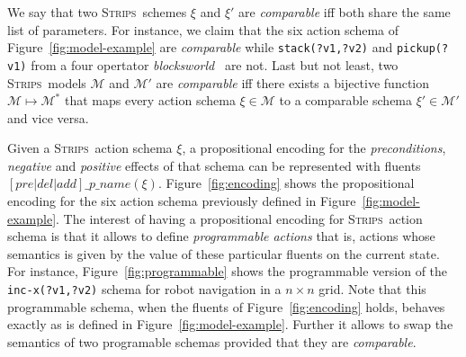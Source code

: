 \documentclass[letterpaper]{article} %
\newcommand{\strips}{\textsc{Strips}}     %
\begin{document}
We say that two \strips\ schemes $\xi$ and $\xi'$ are {\em comparable} iff both share the same list of parameters. For instance, we claim that the six action schema of Figure~\ref{fig:model-example} are {\em comparable} while {\small\tt stack(?v1,?v2)} and {\small\tt pickup(?v1)} from a four opertator {\em blocksworld}~\cite{slaney2001blocks} are not. Last but not least, two \strips\ models $\mathcal{M}$ and $\mathcal{M}'$ are {\em comparable} iff there exists a bijective function $\mathcal{M} \mapsto \mathcal{M}^*$ that maps every action schema $\xi\in\mathcal{M}$ to a comparable schema $\xi'\in\mathcal{M'}$ and vice versa.

Given a \strips\ action schema $\xi$, a propositional encoding for the {\em preconditions}, {\em negative} and {\em positive} effects of that schema can be represented with fluents $[pre|del|add]\_p\_name(\xi)$. Figure~\ref{fig:encoding} shows the propositional encoding for the six action schema previously defined in Figure~\ref{fig:model-example}. The interest of having a propositional encoding for \strips\ action schema is that it allows to define {\em programmable actions} that is, actions whose semantics is given by the value of these particular fluents on the current state. For instance, Figure~\ref{fig:programmable} shows the programmable version of the {\tt\small inc-x(?v1,?v2)} schema for robot navigation in a $n\times n$ grid. Note that this programmable schema, when the fluents of Figure~\ref{fig:encoding} holds, behaves exactly as is defined in Figure~\ref{fig:model-example}. Further it allows to swap the semantics of two programable schemas provided that they are {\em comparable}. 
\end{document}
